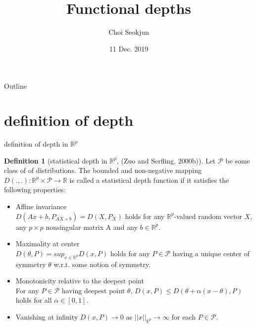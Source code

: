 \documentclass[aspectratio=169,ignorenonframetext,9pt]{beamer}
\title{Functional depths}
\author{Choi Seokjun}
\date{11 Dec. 2019}
\theoremstyle{plain}
\theoremstyle{definition}
\newtheorem{defn}{Definition}[section]
\begin{document}
\begin{frame}
\maketitle
\end{frame}




\begin{frame}{Outline}
\tableofcontents
\end{frame}



\section{definition of depth}
\begin{frame}{definition of depth in $\mathbb{R}^p$}
\begin{defn}[statistical depth in $\mathbb{R}^p$, (Zuo and Serfling, 2000b)]
Let $\mathcal{P}$ be some class of of distributions.
The bounded and non-negative mapping $D(.,.): \mathbb{R}^p\times \mathcal{P} \rightarrow \mathbb{R}$ is called
a statistical depth function if it satisfies the following properties:
\begin{itemize}
    \item Affine invariance \\
        $D(Ax+b,P_{AX+b})=D(X,P_X)$ holds for any $\mathbb{R}^p$-valued random vector $X$,
        any $p\times p$ nonsingular matrix A and any $b\in \mathbb{R}^p$.
    \item Maximality at center \\
        $D(\theta,P)=sup_{x\in\mathbb{R}^p}D(x,P)$ holds for any $P\in\mathcal{P}$
        having a unique center of symmetry $\theta$ w.r.t. some notion of symmetry.
    \item Monotonicity relative to the deepest point \\
        For any $P \in \mathcal{P}$ having deepest point $\theta$, $D(x,P)\leq D(\theta+\alpha(x-\theta), P)$
        holds for all $\alpha\in[0,1]$.
    \item Vanishing at infinity
        $D(x,P)\rightarrow0$ as $||x||_{\mathbb{R}^p}\rightarrow\infty$
        for each $P\in\mathcal{P}$.
\end{itemize}
\end{defn}
\end{frame}
\end{document}
